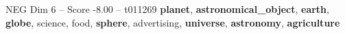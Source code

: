 \begin{textsample}{NEG Dim 6 – Score -8.00 – t011269}  \label{ex:f6_neg_034}
\textbf{planet}, \textbf{astronomical\_object}, \textbf{earth}, \textbf{globe}, science, food, \textbf{sphere}, advertising, \textbf{universe}, \textbf{astronomy}, \textbf{agriculture}

\end{textsample}
